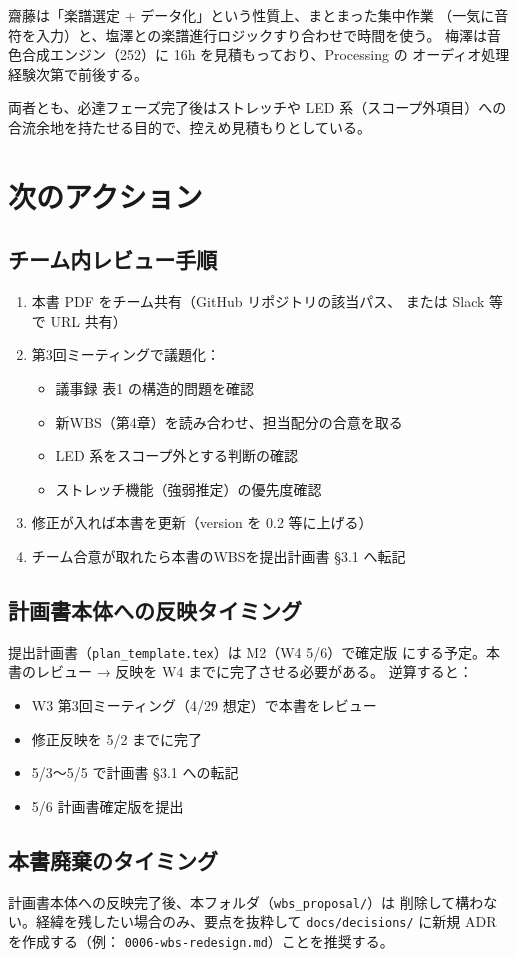 \documentclass[lualatex,book,paper=a4paper,jafontsize=11pt,jafontscale=1.05]{jlreq}
\begin{document}
齋藤は「楽譜選定 + データ化」という性質上、まとまった集中作業
（一気に音符を入力）と、塩澤との楽譜進行ロジックすり合わせで時間を使う。
梅澤は音色合成エンジン（252）に 16h を見積もっており、Processing の
オーディオ処理経験次第で前後する。

両者とも、必達フェーズ完了後はストレッチや LED 系（スコープ外項目）への
合流余地を持たせる目的で、控えめ見積もりとしている。

\chapter{次のアクション}

\section{チーム内レビュー手順}

\begin{enumerate}
  \item 本書 PDF をチーム共有（GitHub リポジトリの該当パス、
        または Slack 等で URL 共有）
  \item 第3回ミーティングで議題化：
        \begin{itemize}
          \item 議事録 表1 の構造的問題を確認
          \item 新WBS（第4章）を読み合わせ、担当配分の合意を取る
          \item LED 系をスコープ外とする判断の確認
          \item ストレッチ機能（強弱推定）の優先度確認
        \end{itemize}
  \item 修正が入れば本書を更新（version を 0.2 等に上げる）
  \item チーム合意が取れたら本書のWBSを提出計画書 §3.1 へ転記
\end{enumerate}

\section{計画書本体への反映タイミング}

提出計画書（\texttt{plan\_template.tex}）は M2（W4 5/6）で確定版
にする予定。本書のレビュー → 反映を W4 までに完了させる必要がある。
逆算すると：

\begin{itemize}
  \item W3 第3回ミーティング（4/29 想定）で本書をレビュー
  \item 修正反映を 5/2 までに完了
  \item 5/3〜5/5 で計画書 §3.1 への転記
  \item 5/6 計画書確定版を提出
\end{itemize}

\section{本書廃棄のタイミング}

計画書本体への反映完了後、本フォルダ（\texttt{wbs\_proposal/}）は
削除して構わない。経緯を残したい場合のみ、要点を抜粋して
\texttt{docs/decisions/} に新規 ADR を作成する（例：
\texttt{0006-wbs-redesign.md}）ことを推奨する。
\end{document}
